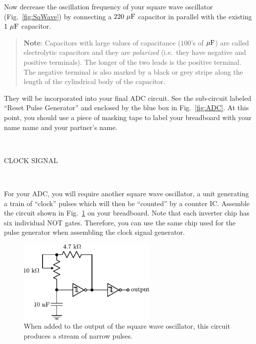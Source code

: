 \documentclass[12pt,oneside,openany,letterpaper]{article}
\begin{document}
\noindent Now decrease the oscillation frequency of your square wave oscillator (Fig.~\ref{fig:SqWave}) by connecting a $220\rm\ \mu F$ capacitor in parallel with the existing $1\rm\ \mu F$ capacitor. 

\begin{quote}
{\bf Note}: Capacitors with large values of capacitance ($100$'s of $\rm \mu F$) are called electrolytic capacitors and they are {\it polarized} (i.e.\ they have negative and positive terminals).  The longer of the two leads is the positive terminal. The negative terminal is also marked by a black or grey stripe along the length of the cylindrical body of the capacitor.
\end{quote}

  They will be incorporated into your final ADC circuit. See the sub-circuit labeled ``Reset Pulse Generator'' and enclosed by the blue box in Fig.~\ref{fig:ADC}.  At this point, you should use a piece of masking tape to label your breadboard with your name name and your partner's name.

~

\noindent CLOCK SIGNAL

~

\noindent For your ADC, you will require another square wave oscillator, a unit generating a
train of ``clock'' pulses which will then be ``counted'' by a counter IC.  Assemble the circuit shown in Fig.~\ref{fig:clock} on your breadboard.  Note that each inverter chip has six individual NOT gates.  Therefore, you can use the same chip used for the pulse generator when assembling the clock signal generator.

\begin{figure}[h!]
\centering
    \includegraphics[width=0.6\textwidth]{figures/clockSignal.pdf}
    \caption{When added to the output of the square wave oscillator, this circuit produces a stream of narrow pulses.}
    \label{fig:clock}
\end{figure}
\end{document}
